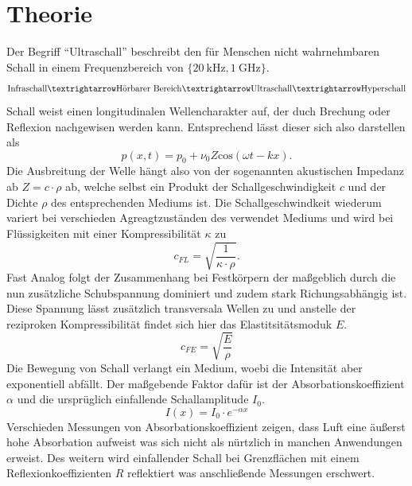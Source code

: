 \section{Theorie}
Der Begriff \enquote{Ultraschall} beschreibt den für Menschen nicht wahrnehmbaren Schall in einem Frequenzbereich von $\{\SI{20}{\kilo\hertz},\SI{1}{\giga\hertz}\}$.
\begin{align*}
    \text{Infraschall}  \textrightarrow \text{Hörbarer Bereich}  \textrightarrow \text{Ultraschall}  \textrightarrow \text{Hyperschall} 
\end{align*} 
Schall weist einen longitudinalen Wellencharakter auf, der duch Brechung oder Reflexion nachgewisen werden kann. Entsprechend lässt dieser sich also darstellen als
\begin{equation*}
    p(x,t) =  p_0 + \nu_0 Z \text{cos} (\omega t - kx).
\end{equation*}
Die Ausbreitung der Welle hängt also von der sogenannten akustischen Impedanz ab $Z=c\cdot\rho$ ab, welche selbst ein Produkt der
Schallgeschwindigkeit $c$ und der Dichte $\rho$ des entsprechenden Mediums ist. Die Schallgeschwindkeit wiederum variert bei verschieden Agreagtzuständen des verwendet Mediums
und wird bei Flüssigkeiten mit einer Kompressibilität $\kappa$ zu
\begin{equation*}
    c_{FL}=\sqrt{\frac{1}{\kappa \cdot \rho}}.
\end{equation*}
Fast Analog folgt der Zusammenhang bei Festkörpern der maßgeblich durch die nun zusätzliche Schubspannung dominiert und zudem stark Richungsabhängig ist.
Diese Spannung lässt zusätzlich transversala Wellen zu und anstelle der reziproken Kompressibilität findet sich hier das Elastitsitätsmoduk $E$.
\begin{equation*}
    c_{FE}=\sqrt{\frac{E}{\rho}}
\end{equation*}
Die Bewegung von Schall verlangt ein Medium, woebi die Intensität aber exponentiell abfällt.
Der maßgebende Faktor dafür ist der Absorbationskoeffizient $\alpha$ und die ursprüglich einfallende Schallamplitude $I_0$.
\begin{equation*}
    I(x)=I_0 \cdot e^{-\alpha x}
\end{equation*}
Verschieden Messungen von Absorbationskoeffizient %
zeigen, dass Luft eine äußerst hohe Absorbation aufweist was sich nicht als nürtzlich in manchen Anwendungen erweist.
Des weitern wird einfallender Schall bei Grenzflächen mit einem Reflexionkoeffizienten $R$ reflektiert was anschließende Messungen erschwert.
